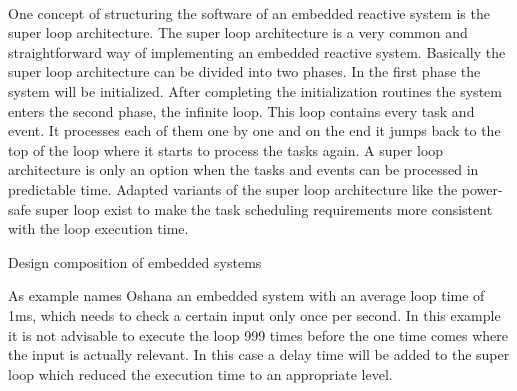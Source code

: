 {\noindent\\ One concept of structuring the software of an embedded reactive system is the super loop architecture. The super loop architecture is a very common and straightforward way of implementing an embedded reactive system. Basically the super loop architecture can be divided into two phases. In the first phase the system will be initialized. After completing the initialization routines the system enters the second phase, the infinite loop. This loop contains every task and event. It processes each of them one by one and on the end it jumps back to the top of the loop where it starts to process the tasks again. A super loop architecture is only an option when the tasks and events can be processed in predictable time. Adapted variants of the super loop architecture like the power-safe super loop exist to make the task scheduling requirements more consistent with the loop execution time. \cite[cf.][24]{Oshana2013} 

\begin{floatingfigure}[r]{72mm}
\centering
\mbox{}
\caption{Design composition of embedded systems \cite[][50]{Walls2012}}
\label{fig:designComposition}
\end{floatingfigure}

\noindent As example names Oshana an embedded system with an average loop time of 1ms, which needs to check a certain input only once per second. In this example it is not advisable to execute the loop 999 times before the one time comes where the input is actually relevant. In this case a delay time will be added to the super loop which reduced the execution time to an appropriate level. 

}
